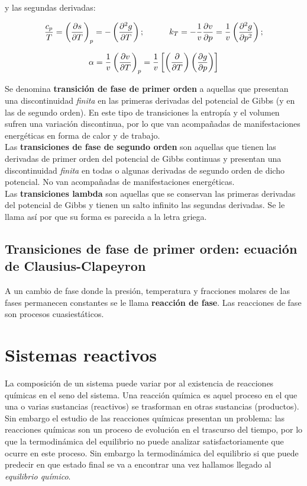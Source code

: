 \documentclass[12pt,a4paper,oneside]{book}
\begin{document}
y las segundas derivadas:

\begin{equation}
\dfrac{c_p}{T} = \left( \frac{\partial s}{\partial T} \right)_p = - \left( \frac{\partial ^2 g}{\partial T} \right);  \quad \quad \quad k_T = - \dfrac{1}{v} \frac{\partial v}{\partial p} = \dfrac{1}{v} \left( \frac{\partial ^2 g}{\partial p^2} \right);
\end{equation}

\begin{equation}
\alpha = \dfrac{1}{v} \left( \frac{\partial v}{\partial T} \right)_p = \dfrac{1}{v} \left[ \left( \frac{\partial }{\partial T} \right) \left( \frac{\partial g}{\partial p} \right) \right]
\end{equation}

Se denomina \textbf{transición de fase de primer orden} a aquellas que presentan una discontinuidad \textit{finita}  en las primeras derivadas del potencial de Gibbs (y en las de segundo orden). En este tipo de transiciones la entropía y el volumen sufren una variación discontinua, por lo que van acompañadas de manifestaciones energéticas en forma de calor y de trabajo. \\

Las \textbf{transiciones de fase de segundo orden} son aquellas que tienen las derivadas de primer orden del potencial de Gibbs continuas y presentan una discontinuidad \textit{finita} en todas o algunas derivadas de segundo orden de dicho potencial. No van acompañadas de manifestaciones energéticas.\\

Las \textbf{transiciones lambda} son aquellas que se conservan las primeras derivadas del potencial de Gibbs y tienen un salto infinito las segundas derivadas. Se le llama así por que su forma es parecida a la letra griega.


\section{Transiciones de fase de primer orden: ecuación de Clausius-Clapeyron}

A un cambio de fase donde la presión, temperatura y fracciones molares de las fases permanecen constantes se le llama \textbf{reacción de fase}. Las reacciones de fase son procesos cuasiestáticos. 


\chapter{Sistemas reactivos}

La composición de un sistema puede variar por al existencia de reacciones químicas en el seno del sistema. Una reacción química es aquel proceso en el que una o varias sustancias (reactivos) se trasforman en otras sustancias (productos). Sin embargo el estudio de las reacciones químicas presentan un problema: las reacciones químicas son un proceso de evolución en el trascurso del tiempo, por lo que la termodinámica del equilibrio no puede analizar satisfactoriamente que ocurre en este proceso. Sin embargo la termodinámica del equilibrio si que puede predecir en que estado final se va a encontrar una vez hallamos llegado al \textit{equilibrio químico}. \\
\end{document}
